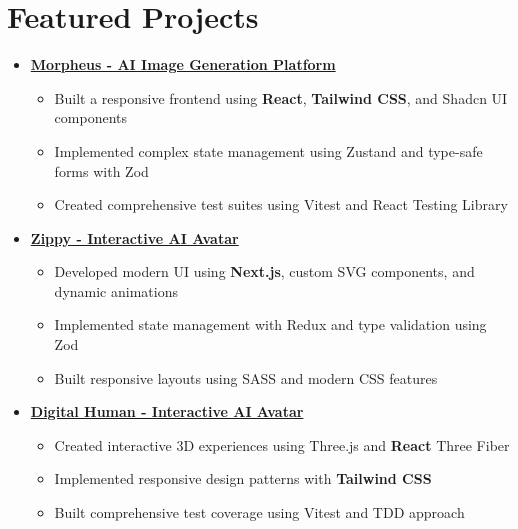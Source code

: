 \documentclass[letterpaper,11pt]{article}
\newcommand{\normalfaExternalLink}{{\mdseries\faExternalLink}}
\begin{document}
\section{Featured Projects}
\begin{itemize}[leftmargin=*]
    \item \textbf{\href{https://github.com/Monadical-SAS/Morpheus}{Morpheus - AI Image Generation Platform \normalfaExternalLink}}
    \begin{itemize}
        \item Built a responsive frontend using \textbf{React}, \textbf{Tailwind CSS}, and Shadcn UI components
        \item Implemented complex state management using Zustand and type-safe forms with Zod
        \item Created comprehensive test suites using Vitest and React Testing Library
    \end{itemize}
    
    \item \textbf{\href{https://github.com/asanchezyali/ai-avatar}{Zippy - Interactive AI Avatar \normalfaExternalLink}}
    \begin{itemize}
        \item Developed modern UI using \textbf{Next.js}, custom SVG components, and dynamic animations
        \item Implemented state management with Redux and type validation using Zod
        \item Built responsive layouts using SASS and modern CSS features
    \end{itemize}

    \item \textbf{\href{https://github.com/asanchezyali/talking-avatar-with-ai}{Digital Human - Interactive AI Avatar \normalfaExternalLink}}
    \begin{itemize}
        \item Created interactive 3D experiences using Three.js and \textbf{React} Three Fiber
        \item Implemented responsive design patterns with \textbf{Tailwind CSS}
        \item Built comprehensive test coverage using Vitest and TDD approach
    \end{itemize}
\end{itemize}
\end{document}
